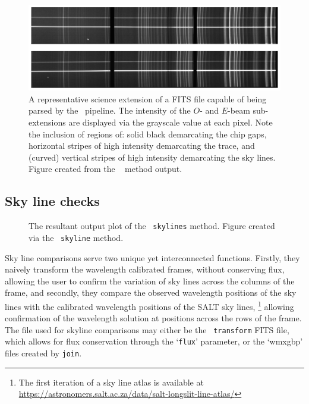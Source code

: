 \begin{figure}[t]
    \centering
    \includegraphics[width = 1.0\textwidth]{figures/3_post_wav_cal.pdf}
    \caption{A representative science extension of a \gls{FITS} file capable of being parsed by the \polsalt\ pipeline. The intensity of the $O$- and $E$-beam sub-extensions are displayed via the grayscale value at each pixel. Note the inclusion of regions of: solid black demarcating the chip gaps, horizontal stripes of high intensity demarcating the trace, and (curved) vertical stripes of high intensity demarcating the sky lines. Figure created from the \stops\  method output.}
    \label{fig:polsalt_post_wav_cal}
\end{figure}

\subsection{Sky line checks} \label{subsec:stops_skyline}



\begin{figure}[t]
    \centering
    \caption{The resultant output plot of the \stops\ \texttt{skylines} method. Figure created via the \stops\ \texttt{skyline} method.}
    \label{fig:stops_sky_eg}
\end{figure}

Sky line comparisons serve two unique yet interconnected functions. Firstly, they naively transform the wavelength calibrated frames, without conserving flux, allowing the user to confirm the variation of sky lines across the columns of the frame, and secondly, they compare the observed wavelength positions of the sky lines with the calibrated wavelength positions of the \gls{SALT} sky lines,%
\footnote{The first iteration of a sky line atlas is available at \url{https://astronomers.salt.ac.za/data/salt-longslit-line-atlas/}}
allowing confirmation of the wavelength solution at positions across the rows of the frame. The file used for skyline comparisons may either be the \iraf\ \texttt{transform} \gls{FITS} file, which allows for flux conservation through the `\texttt{flux}' parameter, or the `wmxgbp' files created by \texttt{join}.

